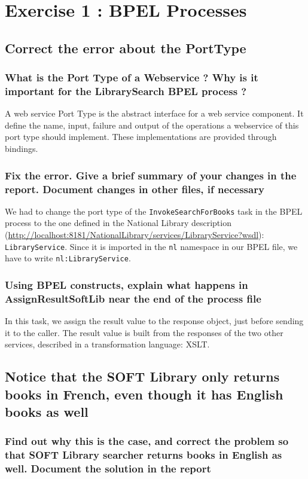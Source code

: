 \section{Exercise 1 : BPEL Processes}

\subsection{Correct the error about the PortType}
\subsubsection{What is the Port Type of a Webservice ? Why is it important for the LibrarySearch BPEL process ?}
A web service Port Type is the abstract interface for a web service component. It define the name, input, failure and output of the operations a webservice of this port type should implement. These implementations are provided through bindings.

\subsubsection{Fix the error. Give a brief summary of your changes in the report. Document changes in other files, if necessary}

We had to change the port type of the \texttt{InvokeSearchForBooks} task in the BPEL process to the one defined in the National Library description (\url{http://localhost:8181/NationalLibrary/services/LibraryService?wsdl}): \texttt{LibraryService}. Since it is imported in the \texttt{nl} namespace in our BPEL file, we have to write \texttt{nl:LibraryService}.

\subsubsection{Using BPEL constructs, explain what happens in AssignResultSoftLib near the end of the process file}
In this task, we assign the result value to the response object, just before sending it to the caller. The result value is built from the responses of the two other services, described in a transformation language: XSLT.

\subsection{Notice that the SOFT Library only returns books in French, even though it has English books as well}
\subsubsection{Find out why this is the case, and correct the problem so that SOFT Library searcher returns books in English as well. Document the solution in the report}

